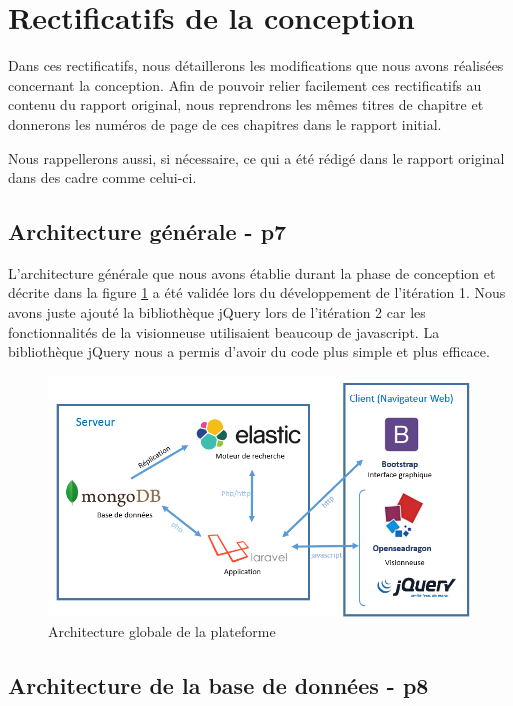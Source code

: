 \section{Rectificatifs de la conception}
\label{sec:majconc}

Dans ces rectificatifs, nous détaillerons les modifications que nous avons réalisées concernant la conception\cite{Conc}. Afin de pouvoir relier facilement ces rectificatifs au contenu du rapport original, nous reprendrons les mêmes titres de chapitre et donnerons les numéros de page de ces chapitres dans le rapport initial.
\begin{leftonly}
   Nous rappellerons aussi, si nécessaire, ce qui a été rédigé dans le rapport original dans des cadre comme celui-ci. 
\end{leftonly}

\subsection{Architecture générale - p7}

L'architecture générale que nous avons établie durant la phase de conception et décrite dans la figure \ref{archi} a été validée lors du développement de l'itération 1. Nous avons juste ajouté la bibliothèque jQuery lors de l'itération 2 car les fonctionnalités de la visionneuse utilisaient beaucoup de javascript. La bibliothèque jQuery nous a permis d'avoir du code plus simple et plus efficace.

    \begin{figure}[H]
        \centering
        \includegraphics[width=\textwidth]{figure/Archi.png}
            \caption{Architecture globale de la plateforme}
            \label{archi}
    \end{figure}
		
\subsection{Architecture de la base de données - p8}


